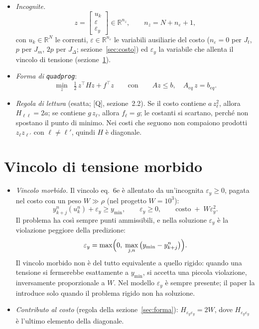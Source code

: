 \documentclass[11pt,a4paper]{article}
\newcommand{\rifq}{[Q]}                     %
\newcommand{\ip}[1]{\textbf{(H#1)}}         %
\begin{document}
\begin{itemize}
  \item \emph{Incognite.}
        \[
          z = \begin{bmatrix} u_k \\ \varepsilon \\ \varepsilon_y \end{bmatrix} \in \mathbb{R}^{n_z},
          \qquad n_z = N + n_\varepsilon + 1 ,
        \]
        con $u_k \in \mathbb{R}^N$ le correnti, $\varepsilon \in
        \mathbb{R}^{n_\varepsilon}$ le variabili ausiliarie del costo
        ($n_\varepsilon = 0$ per $J_t$, $p$ per $J_m$, $2p$ per $J_\Delta$;
        sezione~\ref{sec:costo}) ed $\varepsilon_y$ la variabile che allenta il vincolo di
        tensione (sezione~\ref{sec:morbido}).
  \item \emph{Forma di \texttt{quadprog}}:
        \[
          \min_{z} \;\; \tfrac12\, z^\top H z + f^\top z
          \qquad \text{con} \qquad A z \le b , \quad A_{eq}\, z = b_{eq} .
        \]
  \item \emph{Regola di lettura} (esatta; {\rifq}, sezione~2.2). Se il costo
        contiene $a\,z_\ell^2$, allora $H_{\ell\ell} = 2a$; se contiene
        $g\,z_\ell$, allora $f_\ell = g$; le costanti si scartano, perché non
        spostano il punto di minimo. Nei costi che seguono non compaiono
        prodotti $z_\ell z_{\ell'}$ con $\ell \ne \ell'$, quindi $H$ è diagonale.
\end{itemize}

\section{Vincolo di tensione morbido}\label{sec:morbido}

\begin{itemize}
  \item[\ip{14}] \emph{Vincolo morbido.} Il vincolo eq.~6e è allentato da
        un'incognita $\varepsilon_y \ge 0$, pagata nel costo con un peso $W \gg \rho$ (nel
        progetto $W = 10^3$):
        \[
          y^n_{k+j}(u^n_k) + \varepsilon_y \ge y_{\min} , \qquad \varepsilon_y \ge 0 , \qquad
          \text{costo} \;+\; W \varepsilon_y^2 .
          \tag*{eq.~17}
        \]
        Il problema ha così sempre punti ammissibili, e nella soluzione $\varepsilon_y$
        è la violazione peggiore della predizione:
        \[
          \varepsilon_y = \max\Bigl(0,\; \max_{j,n}\, \bigl(y_{\min} - y^n_{k+j}\bigr)\Bigr) .
        \]
        Il vincolo morbido non è del tutto equivalente a quello rigido: quando una tensione si
        fermerebbe esattamente a $y_{\min}$, si accetta una piccola violazione,
        inversamente proporzionale a $W$. Nel modello $\varepsilon_y$ è sempre presente;
        il paper la introduce solo quando il problema rigido non ha soluzione.
  \item \emph{Contributo al costo} (regola della sezione~\ref{sec:forma}):
        $H_{\varepsilon_y\varepsilon_y} = 2W$, dove
        $H_{\varepsilon_y\varepsilon_y}$ è l'ultimo elemento della diagonale.
\end{itemize}
\end{document}
